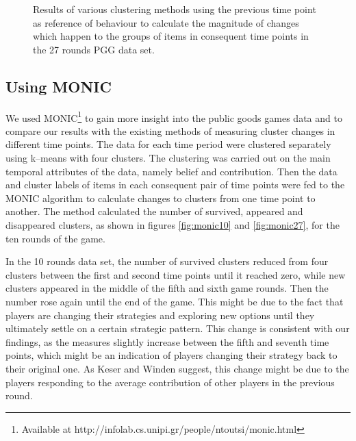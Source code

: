 \begin{figure}[!h]
{\begin{minipage}{\dimexpr \textwidth-2\fboxsep-2\fboxrule}
    \end{minipage}}
    \caption{Results of various clustering methods using the previous time point as reference of behaviour to calculate the magnitude of changes which happen to the groups of items in consequent time points in the 27 rounds PGG data set.}
    \label{fig:game27_ChangeMeasuers_Cons}
\end{figure}
    
\subsection{Using MONIC}
    
We used MONIC\footnote{Available at http://infolab.cs.unipi.gr/people/ntoutsi/monic.html} to gain more insight into the public goods games data and to compare our results with the existing methods of measuring cluster changes in different time points. The data for each time period were clustered separately using k--means with four clusters. The clustering was carried out on the main temporal attributes of the data, namely belief and contribution. Then the data and cluster labels of items in each consequent pair of time points were fed to the MONIC algorithm to calculate changes to clusters from one time point to another. The method calculated the number of survived, appeared and disappeared clusters, as shown in figures \ref{fig:monic10} and \ref{fig:monic27}, for the ten rounds of the game.
    
    
In the 10 rounds data set, the number of survived clusters reduced from four clusters between the first and second time points until it reached zero, while new clusters appeared in the middle of the fifth and sixth game rounds. Then the number rose again until the end of the game. This might be due to the fact that players are changing their strategies and exploring new options until they ultimately settle on a certain strategic pattern. This change is consistent with our findings, as the measures slightly increase between the fifth and seventh time points, which might be an indication of players changing their strategy back to their original one. As Keser and Winden \cite{Keser2000} suggest, this change might be due to the players responding to the average contribution of other players in the previous round.
    
